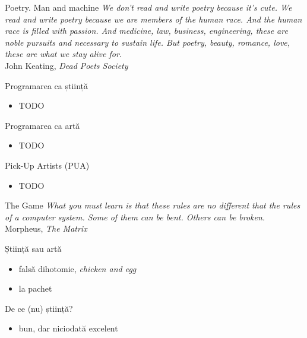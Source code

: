 \documentclass{beamer}
\begin{document}
\begin{frame}{Poetry. Man and machine}
  \textit{We don't read and write poetry because it's cute. We read and write poetry because we are members of the human race. And the human race is filled with passion. And medicine, law, business, engineering, these are noble pursuits and necessary to sustain life. But poetry, beauty, romance, love, these are what we stay alive for.}\\
  \vspace{0.5cm}
  \hfill{John Keating, \textit{Dead Poets Society}}
\end{frame}

\begin{frame}{Programarea ca știință}
  \begin{itemize}
    \item TODO
  \end{itemize}
\end{frame}

\begin{frame}{Programarea ca artă}
  \begin{itemize}
    \item TODO
  \end{itemize}
\end{frame}

\begin{frame}{Pick-Up Artists (PUA)}
  \begin{itemize}
    \item TODO
  \end{itemize}
\end{frame}

\begin{frame}{The Game}
  \textit{What you must learn is that these rules are no different that the rules of a computer system. Some of them can be bent. Others can be broken.}\\
  \vspace{0.5cm}
  \hfill{Morpheus, \textit{The Matrix}}
\end{frame}

\begin{frame}{Știință sau artă}
  \begin{itemize}
    \item falsă dihotomie, \textit{chicken and egg}
    \item la pachet
  \end{itemize}
\end{frame}

\begin{frame}{De ce (nu) știință?}
  \begin{itemize}
    \item bun, dar niciodată excelent
  \end{itemize}
\end{frame}
\end{document}
